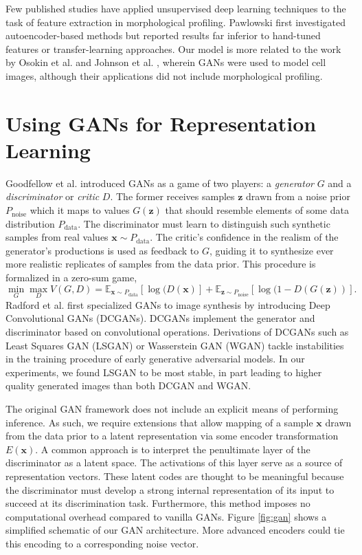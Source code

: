 \documentclass{article}
\begin{document}
Few published studies have applied unsupervised deep learning techniques to the task of feature extraction in morphological profiling. Pawlowski \cite{pawlowski2016msc} first investigated autoencoder-based methods but reported results far inferior to hand-tuned features or transfer-learning approaches. Our model is more related to the work by Osokin et al. \cite{osokin2017gans} and Johnson et al. \cite{johnson2017generative}, wherein GANs were used to model cell images, although their applications did not include morphological profiling.

\section{Using GANs for Representation Learning}
Goodfellow et al. \cite{goodfellow2014generative} introduced GANs as a game of
two players: a \emph{generator} $G$ and a \emph{discriminator} or \emph{critic} $D$. The former receives samples $\mathbf{z}$ drawn from a noise prior $P_{\text{noise}}$ which it maps to values $G(\mathbf{z})$ that should resemble elements of some data distribution $P_{\text{data}}$. The discriminator must learn to distinguish such synthetic samples from real values $\mathbf{x} \sim P_{\text{data}}$. The critic's confidence in the realism of the generator's productions is used as feedback to $G$, guiding it to synthesize ever more realistic replicates of samples from the data prior. This procedure is formalized in a zero-sum game,
\vspace{-1pt}
$$\min_G \max_D V(G, D) = \mathbb{E}_{\mathbf{x} \sim P_{\text{data}}}[\log(D(\mathbf{x})] + \mathbb{E}_{\mathbf{z} \sim P_{\text{noise}}}[\log(1 - D(G(\mathbf{z}))].$$
\vspace{-2pt}
Radford et al. \cite{radford2015unsupervised} first specialized GANs to image synthesis by introducing Deep Convolutional GANs (DCGANs). DCGANs implement the generator and discriminator based on convolutional operations. Derivations of DCGANs such as Least Squares GAN (LSGAN) \cite{mao2016least} or Wasserstein GAN (WGAN) \cite{arjovsky2017wasserstein} tackle instabilities in the training procedure of early generative adversarial models. In our experiments, we found LSGAN to be most stable, in part leading to higher quality generated images than both DCGAN and WGAN.

The original GAN framework does not include an explicit means of performing inference. As such, we require extensions that allow mapping of a sample $\mathbf{x}$ drawn from the data prior to a latent representation via some encoder transformation $E(\mathbf{x})$. A common approach is to interpret the penultimate layer of the discriminator as a latent space. The activations of this layer serve as a source of representation vectors. These latent codes are thought to be meaningful because the discriminator must develop a strong internal representation of its input to succeed at its discrimination task. Furthermore, this method imposes no computational overhead compared to vanilla GANs. Figure \ref{fig:gan} shows a simplified schematic of our GAN architecture. More advanced encoders could tie this encoding to a corresponding noise vector.
\end{document}
